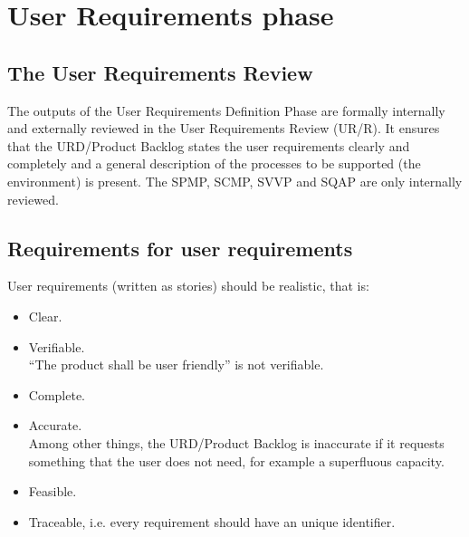 \chapter{User Requirements phase} \label{UR phase}
\section{The User Requirements Review}
The outputs of the User Requirements Definition Phase are formally internally and externally reviewed in the User Requirements Review (UR/R). It ensures that the URD/Product Backlog states the user requirements clearly and completely and a general description of the processes to be supported (the environment) is present. The SPMP, SCMP, SVVP and SQAP are only internally reviewed.

\section{Requirements for user requirements}
User requirements (written as stories) should be realistic, that is:
\begin{itemize}
\item Clear.
\item Verifiable.\\
	``The product shall be user friendly'' is not verifiable.
\item Complete.
\item Accurate.\\
          Among other things, the URD/Product Backlog is inaccurate if it requests something that the user does not
          need, for example a superfluous capacity.
\item Feasible.
\item Traceable, i.e. every requirement should have an unique identifier.
\end{itemize}